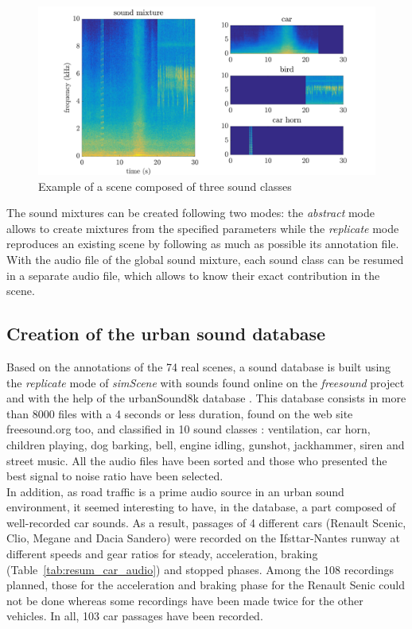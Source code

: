 \documentclass[11pt,letter]{article}
\begin{document}
\begin{figure}[h]
\centering
\includegraphics[width = .7\linewidth]{./pictures/spectrogramme_abstract_sceneSimpleKlaxonFixe_EN.pdf}
\caption{Example of a scene composed of three sound classes}
\label{fig:exampleSimScene}
\end{figure}


The sound mixtures can be created following two modes: the \textit{abstract} mode allows to create mixtures from the specified parameters while the \textit{replicate} mode reproduces an existing scene by following as much as possible its annotation file. With the audio file of the global sound mixture, each sound class can be resumed in a separate audio file, which allows to know their exact contribution in the scene. 

\subsection{Creation of the urban sound database}
Based on the annotations of the 74 real scenes, a sound database is built using the \textit{replicate} mode of \textit{simScene} with sounds found online on the \textit{freesound} project and with the help of the urbanSound8k database \cite{salamon_dataset_nodate}. This database consists in more than 8000 files with a 4 seconds or less duration, found on the web site freesound.org too, and classified in 10 sound classes : ventilation, car horn, children playing, dog barking, bell, engine idling, gunshot, jackhammer, siren and street music. All the audio files have been sorted and those who presented the best signal to noise ratio have been selected.\\

In addition, as road traffic is a prime audio source in an urban sound environment, it seemed interesting to have, in the database, a part composed of well-recorded car sounds. As a result, passages of 4 different cars (Renault Scenic, Clio, Megane and Dacia Sandero) were recorded on the Ifsttar-Nantes runway at different speeds and gear ratios for steady, acceleration, braking (Table~\ref{tab:resum_car_audio}) and stopped phases. Among the 108 recordings planned, those for the acceleration and braking phase for the Renault Senic could not be done whereas some recordings have been made twice for the other vehicles. In all, 103 car passages have been recorded. \\
\end{document}
